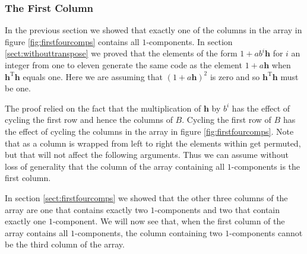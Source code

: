 \subsubsection{The First Column}
\label{sect:thefirstcolumn}
In the previous section we showed that exactly one of the columns in the array in figure \ref{fig:firstfourcomps} contains all $1$-components.
In section \ref{sect:withouttranspose} we proved that the elements of the form $1 + a b^i \mathbf{h}$ for $i$ an integer from one to eleven generate the same code as the element $1 + a \mathbf{h}$ when ${\mathbf{h}}^{\textrm{T}} \mathbf{h}$ equals one.
Here we are assuming that $(1 + a \mathbf{h})^2$ is zero and so ${\mathbf{h}}^{\textrm{T}} \mathbf{h}$ must be one.

The proof relied on the fact that the multiplication of $\mathbf{h}$ by $b^i$ has the effect of cycling the first row and hence the columns of $B$.
Cycling the first row of $B$ has the effect of cycling the columns in the array in figure \ref{fig:firstfourcomps}.
Note that as a column is wrapped from left to right the elements within get permuted, but that will not affect the following arguments.
Thus we can assume without loss of generality that the column of the array containing all $1$-components is the first column.

In section \ref{sect:firstfourcomps} we showed that the other three columns of the array are one that contains exactly two $1$-components and two that contain exactly one $1$-component.
We will now see that, when the first column of the array contains all $1$-components, the column containing two $1$-components cannot be the third column of the array.

